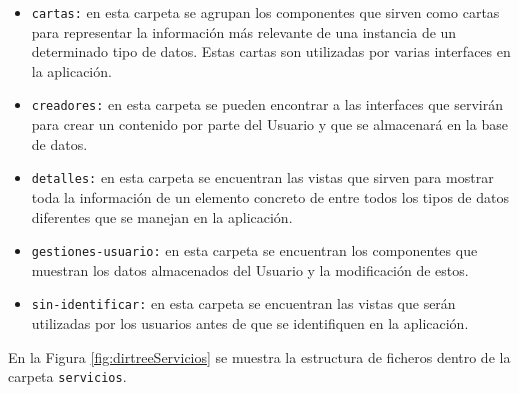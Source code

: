\begin{itemize}
\begin{itemize}
        \item \texttt{cartas:} en esta carpeta se agrupan los componentes que sirven como cartas para representar la información más relevante de una instancia de un determinado tipo de datos. Estas cartas son utilizadas por varias interfaces en la aplicación.
        \item \texttt{creadores:} en esta carpeta se pueden encontrar a las interfaces que servirán para crear un contenido por parte del Usuario y que se almacenará en la base de datos. 
        \item \texttt{detalles:} en esta carpeta se encuentran las vistas que sirven para mostrar toda la información de un elemento concreto de entre todos los tipos de datos diferentes que se manejan en la aplicación.
        \item \texttt{gestiones-usuario:} en esta carpeta se encuentran los componentes que muestran los datos almacenados del Usuario y la modificación de estos.
        \item \texttt{sin-identificar:} en esta carpeta se encuentran las vistas que serán utilizadas por los usuarios antes de que se identifiquen en la aplicación. 
    \end{itemize}
\end{itemize}



En la Figura \ref{fig:dirtreeServicios} se muestra la estructura de ficheros dentro de la carpeta \texttt{servicios}.

